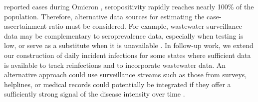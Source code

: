 reported cases during Omicron \citep{ruff2022rapid, nyreinfect2021,
hireinfect2022, wareinfect2022}, seropositivity rapidly reaches nearly 100\% of
the population. Therefore, alternative data sources for estimating the
case-ascertainment ratio must be considered. For example, wastewater
surveillance data may be complementary to seroprevalence data, especially when
testing is low, or serve as a substitute when it is unavailable
\citep{mcmanus2023predicting}. In follow-up work, we extend our
construction of daily incident infections for some states where sufficient data
is available to track reinfections and to incorporate wastewater data.
An alternative approach could use surveillance streams such as those from
surveys, helplines, or medical records could potentially be integrated if they
offer a sufficiently strong signal of the disease intensity over time
\citep{reinhart2021open,ecdc2020strategies}.



